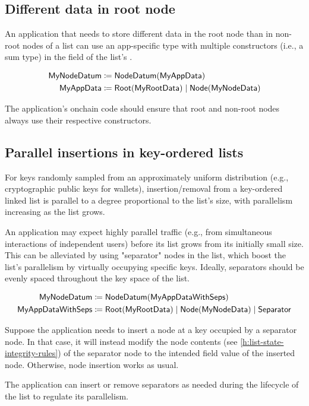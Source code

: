 \documentclass[../midgard.tex]{subfiles}
\begin{document}
\subsection{Different data in root node}
\label{h:list-different-data-in-root}

An application that needs to store different data in the root node than in non-root nodes of a list can use an app-specific type with multiple constructors (i.e., a sum type) in the  field of the list's .

\begin{align*}
    \mathsf{MyNodeDatum} &\coloneq \mathsf{NodeDatum} (\mathsf{MyAppData}) \\
    \mathsf{MyAppData} &\coloneq \mathsf{Root}(\mathsf{MyRootData}) \;|\; \mathsf{Node}(\mathsf{MyNodeData})
\end{align*}

The application's onchain code should ensure that root and non-root nodes always use their respective constructors.

\subsection{Parallel insertions in key-ordered lists}
\label{h:parallel-insertions-in-key-ordered-lists}

For keys randomly sampled from an approximately uniform distribution (e.g., cryptographic public keys for wallets), insertion/removal from a key-ordered linked list is parallel to a degree proportional to the list's size, with parallelism increasing as the list grows.

An application may expect highly parallel traffic (e.g., from simultaneous interactions of independent users) before its list grows from its initially small size.
This can be alleviated by using "separator" nodes in the list, which boost the list's parallelism by virtually occupying specific keys.
Ideally, separators should be evenly spaced throughout the key space of the list.

\begin{align*}
    \mathsf{MyNodeDatum} &\coloneq \mathsf{NodeDatum} (\mathsf{MyAppDataWithSeps}) \\
    \mathsf{MyAppDataWithSeps} &\coloneq \mathsf{Root}(\mathsf{MyRootData}) \;|\;
        \mathsf{Node}(\mathsf{MyNodeData}) \;|\;
        \mathsf{Separator}
\end{align*}

Suppose the application needs to insert a node at a key occupied by a separator node.
In that case, it will instead modify the node contents (see \cref{h:list-state-integrity-rules}) of the separator node to the intended  field value of the inserted node.
Otherwise, node insertion works as usual.

The application can insert or remove separators as needed during the lifecycle of the list to regulate its parallelism.
\end{document}
